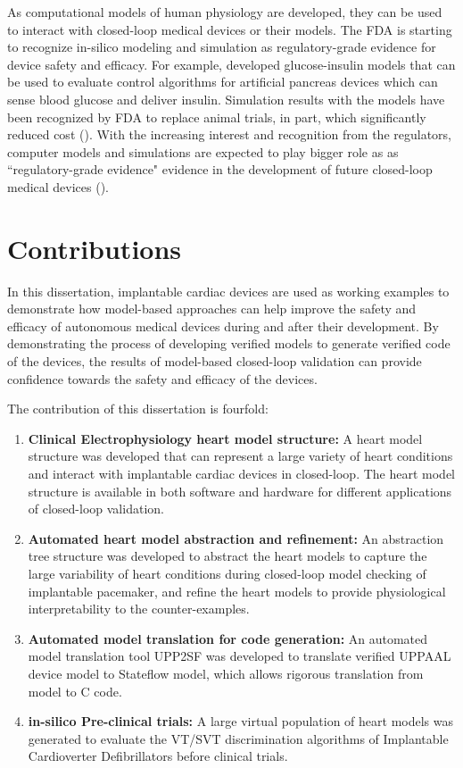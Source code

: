 As computational models of human physiology are developed, they can be used to interact with closed-loop medical devices or their models. 
The FDA is starting to recognize in-silico modeling and simulation as regulatory-grade evidence for device safety and efficacy. 
For example, \cite{pancreas_paul} developed glucose-insulin models that can be used to evaluate control algorithms for artificial pancreas devices which can sense blood glucose and deliver insulin. 
Simulation results with the models have been recognized by FDA to replace animal trials, in part, which significantly reduced cost (\cite{pancreas}). 
With the increasing interest and recognition from the regulators, computer models and simulations are expected to play bigger role as as ``regulatory-grade evidence" evidence in the development of future closed-loop medical devices ().

\section{Contributions}
In this dissertation, implantable cardiac devices are used as working examples to demonstrate how model-based approaches can help improve the safety and efficacy of autonomous medical devices during and after their development. 
By demonstrating the process of developing verified models to generate verified code of the devices, the results of model-based closed-loop validation can provide confidence towards the safety and efficacy of the devices.

The contribution of this dissertation is fourfold:
\begin{enumerate}
	\item \textbf{Clinical Electrophysiology heart model structure: }A heart model structure was developed that can represent a large variety of heart conditions and interact with implantable cardiac devices in closed-loop. The heart model structure is available in both software and hardware for different applications of closed-loop validation.
	\item \textbf{Automated heart model abstraction and refinement: }An abstraction tree structure was developed to abstract the heart models to capture the large variability of heart conditions during closed-loop model checking of implantable pacemaker, and refine the heart models to provide physiological interpretability to the counter-examples.
	\item \textbf{Automated model translation for code generation: }An automated model translation tool UPP2SF was developed to translate verified UPPAAL device model to Stateflow model, which allows rigorous translation from model to C code.
	\item \textbf{in-silico Pre-clinical trials: }A large virtual population of heart models was generated to evaluate the VT/SVT discrimination algorithms of Implantable Cardioverter Defibrillators before clinical trials.
\end{enumerate}


